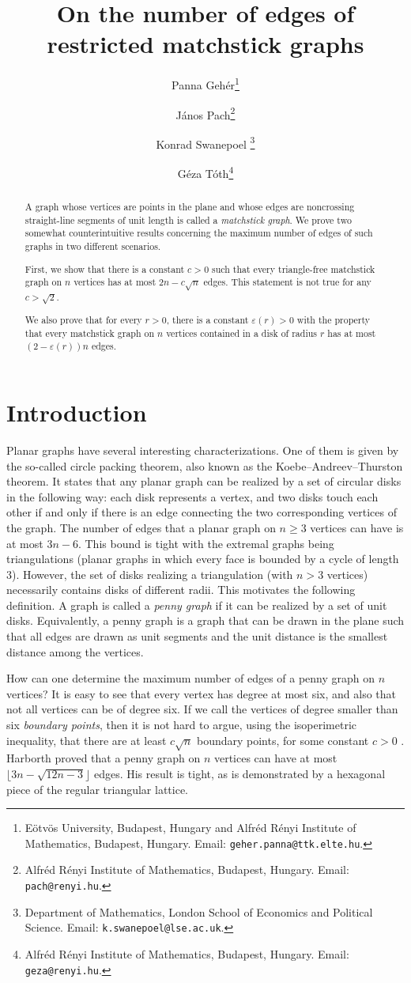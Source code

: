 \documentclass[12pt]{article}
\date{}
\title{On the number of edges of restricted matchstick graphs }
\author{Panna Geh\'er\thanks{E\"otv\"os University, Budapest, Hungary and Alfr\'ed R\'enyi Institute of Mathematics, Budapest, Hungary. Email: \texttt{geher.panna@ttk.elte.hu}.}
\and J\'anos Pach\thanks{Alfr\'ed R\'enyi Institute of Mathematics, Budapest, Hungary. Email: \texttt{pach@renyi.hu}.}
\and Konrad Swanepoel \thanks{Department of Mathematics, London School of Economics and Political Science. \newline Email: \texttt{k.swanepoel@lse.ac.uk}.}
\and G\'eza T\'oth\thanks{Alfr\'ed R\'enyi Institute of Mathematics, Budapest, Hungary. Email: \texttt{geza@renyi.hu}.}}
\theoremstyle{plain}
\theoremstyle{definition}
\theoremstyle{remark}
\begin{document}
\maketitle


\begin{abstract}

A graph whose vertices are points in the plane and whose edges are noncrossing straight-line segments of unit length is called a \emph{matchstick graph}. We prove two somewhat counterintuitive results concerning the maximum number of edges of such graphs in two different scenarios.

First, we show that there is a constant $c>0$ such that every triangle-free matchstick graph on $n$ vertices has at most $2n-c\sqrt{n}$ edges. This statement is not true for any $c>\sqrt2.$

We also prove that for every $r>0$, there is a constant $\varepsilon(r)>0$ with the property that every matchstick graph on $n$ vertices contained in a disk of radius $r$ has at most $(2-\varepsilon(r))n$ edges.
 

\end{abstract}

\section{Introduction}

Planar graphs have several interesting characterizations. One of them is given by the \mbox{so-called} circle packing theorem, also known as the Koebe--Andreev--Thurston theorem. It states that any planar graph can be realized by a set of circular disks in the following way: each disk represents a vertex, and two disks touch each other if and only if there is an edge connecting the two corresponding vertices of the graph. The number of edges that a planar graph on $n \geq 3$ vertices can have is at most $3n- 6$. This bound is tight with the extremal graphs being triangulations (planar graphs in which every face is bounded by a cycle of length $3$). However, the set of disks realizing a triangulation (with $n > 3$ vertices) necessarily contains disks of different radii. This motivates the following definition. A graph is called a \emph{penny graph} if it can be realized by a set of unit disks. Equivalently, a penny graph is a graph that can be drawn in the plane such that all edges are drawn as unit segments and the unit distance is the smallest distance among the vertices.

How can one determine the maximum number of edges of a penny graph on $n$ vertices? It is easy to see that every vertex has degree at most six, and also that not all vertices can be of degree six. If we call the vertices of degree smaller than six \emph{boundary points}, then it is not hard to argue, using the isoperimetric inequality, that there are at least $c\sqrt n$ boundary points, for some constant $c>0$ \cite{E46}.
Harborth \cite{Harborth74} proved that a penny graph on $n$ vertices can have at most $\lfloor 3n - \sqrt{12n - 3}\rfloor$ edges. His result is tight, as is demonstrated by a hexagonal piece of the regular triangular lattice.
\end{document}
